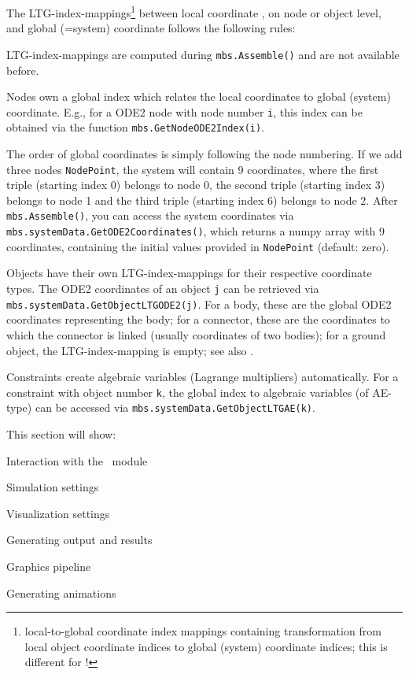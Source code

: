  \label{sec:systemData:LTG}
%
The \ac{LTG}-index-mappings\footnote{local-to-global coordinate index mappings containing transformation from local object coordinate indices to global (system) coordinate indices; this is different for !} between local coordinate , on node or object level, and global (=system) coordinate  follows the following rules:
\bi
\item \ac{LTG}-index-mappings are computed during \texttt{mbs.Assemble()} and are not available before.
\item Nodes own a global index which relates the local coordinates to global (system) coordinate. E.g., for a \ac{ODE2} node with node number \texttt{i}, this index can be obtained via the function \texttt{mbs.GetNodeODE2Index(i)}.
\item The order of global coordinates is simply following the node numbering. If we add three nodes \texttt{NodePoint}, the system will contain 9 coordinates, where the first triple (starting index 0) belongs to node 0, the second triple (starting index 3) belongs to node 1 and the third triple (starting index 6) belongs to node 2. After \texttt{mbs.Assemble()}, you can access the system coordinates via \texttt{mbs.systemData.GetODE2Coordinates()}, which returns a numpy array with 9 coordinates, containing the initial values provided in \texttt{NodePoint} (default: zero).
\item Objects have their own \ac{LTG}-index-mappings for their respective coordinate types. The \ac{ODE2} coordinates of an object \texttt{j} can be retrieved via \texttt{mbs.systemData.GetObjectLTGODE2(j)}. For a body, these are the global \ac{ODE2} coordinates representing the body; for a connector, these are the coordinates to which the connector is linked (usually coordinates of two bodies); for a ground object, the \ac{LTG}-index-mapping is empty; see also .
\item Constraints create algebraic variables (Lagrange multipliers) automatically. For a constraint with object number \texttt{k}, the global index to algebraic variables (of \ac{AE}-type) can be accessed via \texttt{mbs.systemData.GetObjectLTGAE(k)}.
\ei


 \label{sec:exudynBasics}
This section will show:
\bi
  \item Interaction with the \codeName\ module
  \item Simulation settings
  \item Visualization settings
  \item Generating output and results
  \item Graphics pipeline
  \item Generating animations
\ei


